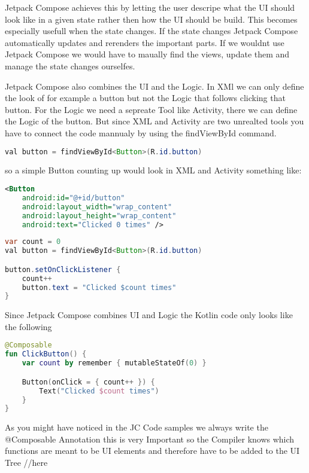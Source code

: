 \documentclass[a4paper, 11pt]{article}
\begin{document}
Jetpack Compose achieves this by letting the user descripe what the UI should look like in a given state rather then how the UI should be build. This becomes especially usefull when the state changes. If the state changes Jetpack Compose automatically updates and rerenders the important parts. If we wouldnt use Jetpack Compose we would have to maually find the views, update them and manage the state changes ourselfes.

Jetpack Compose also combines the UI and the Logic. In XMl we can only define the look of for example a button but not the Logic that  follows clicking that button. For the Logic we need a sepreate Tool like Activity, there we can define the Logic of the button. But since XML and Activity are two unrealted tools you have to connect the code mannualy by using the findViewById command.
\begin{lstlisting}[language = Java]
val button = findViewById<Button>(R.id.button)
 \end{lstlisting}
so a simple Button counting up would look in XML and Activity something like:
\begin{lstlisting}[language=xml, title= {XML UI Button}]
<Button
    android:id="@+id/button"
    android:layout_width="wrap_content"
    android:layout_height="wrap_content"
    android:text="Clicked 0 times" />

 \end{lstlisting}
\begin{lstlisting}[language=Java, title= {Activity Logic Button}]
var count = 0
val button = findViewById<Button>(R.id.button)

button.setOnClickListener {
    count++
    button.text = "Clicked $count times"
}
 \end{lstlisting}

Since Jetpack Compose combines UI and Logic the Kotlin code only looks like the following
\begin{lstlisting}[language=Kotlin, title= {Jetpack Compose Button}]
@Composable
fun ClickButton() {
    var count by remember { mutableStateOf(0) }

    Button(onClick = { count++ }) {
        Text("Clicked $count times")
    }
}
 \end{lstlisting}

As you might have noticed in the JC Code samples we always write the @Composable Annotation  this is very Important so the Compiler knows which functions are meant to be UI elements and therefore have to be added to the UI Tree
//here 
\end{document}

